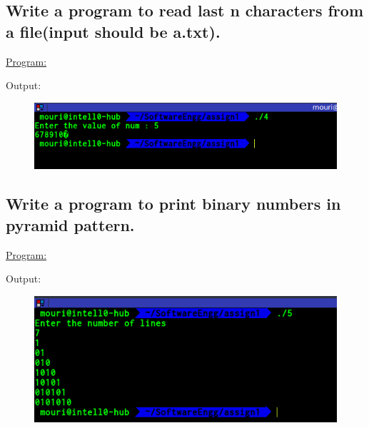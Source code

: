 \documentclass[a4paper,11pt]{article}
\begin{document}
\subsection{Write a program to read last n characters from a file(input should be a.txt).}
\underline{Program:}



Output:
\begin{figure}[H]
\centering
\includegraphics[width=350pt,height=\textheight,keepaspectratio]{./pics/C/4.png}
\end{figure}
\bigskip

\subsection{Write a program to print binary numbers in pyramid pattern.}
\underline{Program:}

Output:
\begin{figure}[H]
\centering
\includegraphics[width=350pt,height=\textheight,keepaspectratio]{./pics/C/5.png}
\end{figure}
\bigskip

\end{document}
